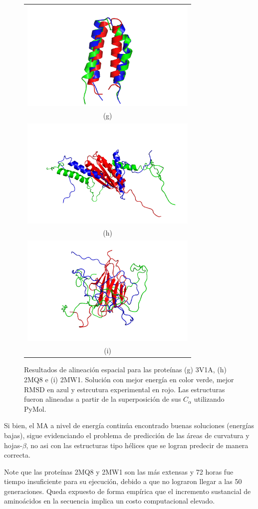 \begin{figure}
\centering
\begin{tabular}{c}
\\
\includegraphics[width=8.5cm]{images/3V1A.png} \\
(g)\\
\includegraphics[width=8.5cm]{images/2MQ8.png} \\
(h)\\
\includegraphics[width=8.5cm]{images/2MW1.png} \\
(i)\\
\end{tabular}
\caption[Alineación espacial de estructuras extensas]{Resultados de alineación espacial para las proteínas (g) 3V1A, (h) 2MQ8 e (i) 2MW1. Solución con mejor energía en color verde, mejor RMSD en azul y estrcutura experimental en rojo. Las estructuras fueron alineadas a partir de la superposición de sus $C_{\alpha}$ utilizando PyMol.}
\label{fig:prot-ext-2}
\end{figure}

Si bien, el MA a nivel de energía continúa encontrado buenas soluciones (energías bajas), sigue evidenciando el problema de predicción de las áreas de curvatura y hojas-$\beta$, no asi con las estructuras tipo hélices que se logran predecir de manera correcta.

Note que las proteínas 2MQ8 y 2MW1 son las más extensas y 72 horas fue tiempo insuficiente para su ejecución, debido a que no lograron llegar a las 50 generaciones. Queda expuesto de forma empírica que el incremento sustancial de aminoácidos en la secuencia implica un costo computacional elevado.
